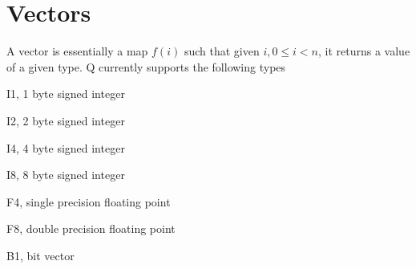 \section{Vectors}
\label{vectors}

A vector is essentially a map \(f(i)\) such that given \(i, 0 \leq i < n\), it
returns a value of a given type. Q currently supports the following types
\be
\item I1, 1 byte signed integer
\item I2, 2 byte signed integer
\item I4, 4 byte signed integer
\item I8, 8 byte signed integer
\item F4, single precision floating point
\item F8, double precision floating point
\item B1, bit vector
\ee
